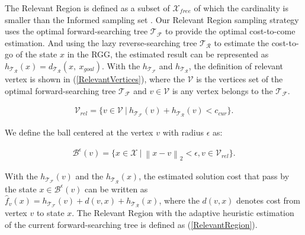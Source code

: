 The Relevant Region is defined as a subset of $\mathcal{X}_{free}$ of which the cardinality is smaller than the Informed sampling set \cite{gammell2014informed}. 
Our Relevant Region sampling strategy uses the optimal forward-searching tree $\mathcal{T}_{\mathcal{F}}$ to provide the optimal cost-to-come estimation.
And using the lazy reverse-searching tree $\mathcal{T}_{\mathcal{R}}$ to estimate the cost-to-go of the state $x$ in the RGG, the estimated result can be represented as $h_{\mathcal{T}_{\mathcal{R}}}(x) = d_{\mathcal{T}_{\mathcal{R}}}(x, \ x_{goal})$.
With the $h_{\mathcal{T}_{\mathcal{F}}}$ and $h_{\mathcal{T}_{\mathcal{R}}}$, the definition of relevant vertex is shown in (\ref{RelevantVertices}), where the $\mathcal{V}$ is the vertices set of the optimal forward-searching tree $\mathcal{T}_{\mathcal{F}}$ and $v \in \mathcal{V}$ is any vertex belongs to the $\mathcal{T}_{\mathcal{F}}$.


\begin{equation}
\begin{aligned}
\mathcal{V}_{rel} = \{ v \in \mathcal{V} \ | \ h_{\mathcal{T}_{\mathcal{F}}}(v) + h_{\mathcal{T}_{\mathcal{R}}}(v) < c_{cur} \}.
\label{RelevantVertices}
\end{aligned}
\end{equation}

We define the ball centered at the vertex $v$ with radius $\epsilon$ as:

\begin{equation}
\begin{aligned}
\mathcal{B}^{\epsilon}(v) = \{ x \in \mathcal{X} \ | \ \left\| x - v \right\|_2 < \epsilon, v \in \mathcal{V}_{rel}\}.
\label{RelevantBall}
\end{aligned}
\end{equation}

With the $h_{\mathcal{T}_{\mathcal{F}}}(v)$ and the $h_{\mathcal{T}_{\mathcal{R}}}(x)$, the estimated solution cost that pass by the state $x \in \mathcal{B}^{\epsilon}(v)$ can be written as $\hat{f}_v(x) = h_{\mathcal{T}_{\mathcal{F}}}(v) + d(v, x) + h_{\mathcal{T}_{\mathcal{R}}}(x)$, where the $d(v, x)$ denotes cost from vertex $v$ to state $x$.
The Relevant Region with the adaptive heuristic estimation of the current forward-searching tree is defined as (\ref{RelevantRegion}).

